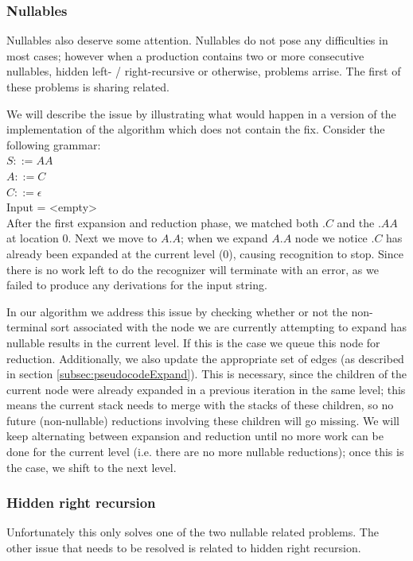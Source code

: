 \documentclass[a4paper,10pt]{article}
\begin{document}
\subsubsection{Nullables}
\label{subsec:nullables}
Nullables also deserve some attention. Nullables do not pose any difficulties in most cases; however when a production contains two or more consecutive nullables, hidden left- / right-recursive or otherwise, problems arrise. The first of these problems is sharing related.

We will describe the issue by illustrating what would happen in a version of the implementation of the algorithm which does not contain the fix.
Consider the following grammar:\\
$S ::= AA$\\
$A ::= C$\\
$C ::= \epsilon$\\
Input = <empty>\\
After the first expansion and reduction phase, we matched both $.C$ and the $.AA$ at location $0$. Next we move to $A.A$; when we expand $A.A$ node we notice $.C$ has already been expanded at the current level ($0$), causing recognition to stop. Since there is no work left to do the recognizer will terminate with an error, as we failed to produce any derivations for the input string.

In our algorithm we address this issue by checking whether or not the non-terminal sort associated with the node we are currently attempting to expand has nullable results in the current level. If this is the case we queue this node for reduction. Additionally, we also update the appropriate set of edges (as described in section \ref{subsec:pseudocodeExpand}). This is necessary, since the children of the current node were already expanded in a previous iteration in the same level; this means the current stack needs to merge with the stacks of these children, so no future (non-nullable) reductions involving these children will go missing. We will keep alternating between expansion and reduction until no more work can be done for the current level (i.e. there are no more nullable reductions); once this is the case, we shift to the next level.

\subsubsection{Hidden right recursion}
\label{subsec:hiddenRightRecursion}
Unfortunately this only solves one of the two nullable related problems. The other issue that needs to be resolved is related to hidden right recursion.
\end{document}
